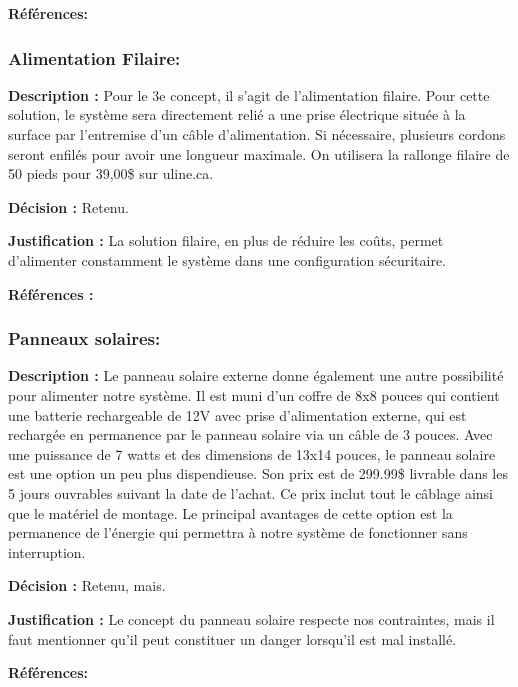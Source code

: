 \textbf{Références:} \cite{Power_Bank}
 
\subsubsection{Alimentation Filaire:}
\textbf{Description :}
Pour le 3e concept, il s'agit de l'alimentation filaire. Pour cette solution, le système sera directement relié a une prise électrique située à la surface par l'entremise d'un câble d'alimentation. Si nécessaire, plusieurs cordons seront enfilés pour avoir une longueur maximale. On utilisera la rallonge filaire de 50 pieds pour 39,00\$ sur uline.ca.
 
 \textbf{Décision :}
 Retenu.
 
 \textbf{Justification :}
 La solution filaire, en plus de réduire les coûts, permet d'alimenter constamment le système dans une configuration sécuritaire.
 
 \textbf{Références :} \cite{fil}
 
\subsubsection{Panneaux solaires:}

\textbf{Description :}
Le panneau solaire externe donne également une autre possibilité pour alimenter notre système. Il est muni d'un coffre de 8x8 pouces qui contient une batterie rechargeable de 12V avec prise d'alimentation externe, qui est rechargée en permanence par le panneau solaire via un câble de 3 pouces. Avec une puissance de 7 watts et des dimensions de 13x14 pouces, le panneau solaire est une option un peu plus dispendieuse. Son prix est de 299.99\$ livrable dans les 5 jours ouvrables suivant la date de l'achat. Ce prix inclut tout le câblage ainsi que le matériel de montage. Le principal avantages de cette option est la permanence de l'énergie qui permettra à notre système de fonctionner sans interruption.

\textbf{Décision :}
Retenu, mais.

\textbf{Justification :}
Le concept du panneau solaire respecte nos contraintes, mais il faut mentionner qu'il peut constituer un danger lorsqu'il est mal installé.


\textbf{Références:} \cite{Panneau_solaire}

